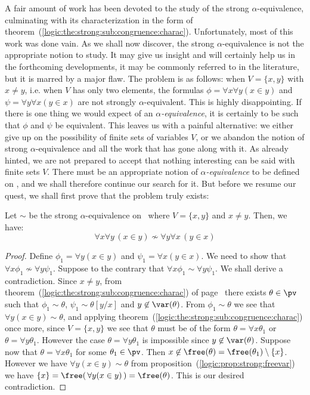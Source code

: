 A fair amount of work has been devoted to the study of the strong 
$\alpha$-equivalence, culminating with its characterization in
the form of theorem~(\ref{logic:the:strong:sub:congruence:charac}).
Unfortunately, most of this work was done vain. As we shall now
discover, the strong $\alpha$-equivalence is not the appropriate
notion to study. It may give us insight and will certainly help us
in the forthcoming developments, it may be commonly referred to in
the literature, but it is marred by a major flaw. The problem is as
follows: when $V=\{x,y\}$ with $x\neq y$, i.e. when $V$ has only two
elements, the formulas $\phi=\forall x\forall y (x\in y)$ and
$\psi=\forall y\forall x(y\in x)$ are not strongly $\alpha$-equivalent. 
This is highly disappointing. If there is one thing we would expect of an 
{\em $\alpha$-equivalence}, it is certainly to be such that $\phi$ and
$\psi$ be equivalent. This leaves us with a painful alternative: we
either give up on the possibility of finite sets of variables $V$,
or we abandon the notion of strong $\alpha$-equivalence and all
the work that has gone along with it. As already hinted, we are not
prepared to accept that nothing interesting can be said with finite
sets $V$. There must be an appropriate notion of 
{\em $\alpha$-equivalence} to be defined on \pv, and we shall 
therefore continue our search for it. But before we resume our quest, 
we shall first prove that the problem truly exists:

\begin{prop}\label{logic:prop:counter:strong:1}
Let $\sim$ be the strong $\alpha$-equivalence on \pv\ where
$V=\{x,y\}$ and $x\neq y$. Then, we have:
    \[
    \forall x\forall y\,(x\in y)\not\sim\forall y\forall x\,(y\in x)
    \]
\end{prop}

\noindent
\begin{proof}
Define $\phi_{1}=\forall y(x\in y)$ and $\psi_{1}=\forall x(y\in
x)$. We need to show that $\forall x\phi_{1}\not\sim\forall
y\psi_{1}$. Suppose to the contrary that $\forall
x\phi_{1}\sim\forall y\psi_{1}$. We shall derive a contradiction.
Since $x\neq y$, from
theorem~(\ref{logic:the:strong:sub:congruence:charac}) of
page~\pageref{logic:the:strong:sub:congruence:charac} there exists
$\theta\in\pv$ such that $\phi_{1}\sim\theta$,
$\psi_{1}\sim\theta[y/x]$ and $y\not\in\var(\theta)$. From
$\phi_{1}\sim\theta$ we see that $\forall y(x\in y)\sim\theta$, and
applying theorem~(\ref{logic:the:strong:sub:congruence:charac}) once
more, since $V=\{x,y\}$ we see that $\theta$ must be of the form
$\theta=\forall x\theta_{1}$ or $\theta=\forall y\theta_{1}$.
However the case $\theta=\forall y\theta_{1}$ is impossible since
$y\not\in\var(\theta)$. Suppose now that $\theta=\forall
x\theta_{1}$ for some $\theta_{1}\in\pv$. Then
$x\not\in\free(\theta)=\free(\theta_{1})\setminus\{x\}$. However we
have $\forall y(x\in y)\sim\theta$ from
proposition~(\ref{logic:prop:strong:freevar}) we have
$\{x\}=\free(\,\forall y(x\in y)\,)=\free(\theta)$. This is our
desired contradiction.
\end{proof}

